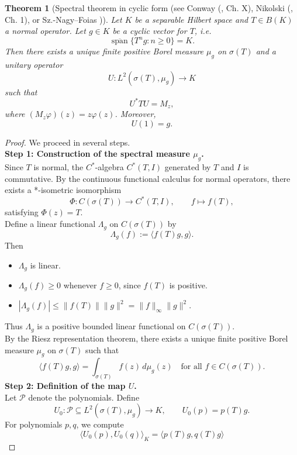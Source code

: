 \documentclass[a4paper,11pt]{article}
\theoremstyle{plain}
\newtheorem{theorem}{Theorem}[section]
\theoremstyle{definition}
\theoremstyle{remark}
\begin{document}
\begin{theorem}[Spectral theorem in cyclic form (see Conway (\cite{Conway1990}, Ch. X), Nikolski (\cite{Nikolski2002}, Ch. 1), or Sz.-Nagy–Foias \cite{NagyFoiasBercoviciKerchy2010})]
\label{theorem-spectral-decomposition-for-continuous-functional-calculus}
Let $K$ be a separable Hilbert space and $T \in B(K)$ a normal operator. 
Let $g \in K$ be a cyclic vector for $T$, i.e.
\[
\overline{\operatorname{span}}\{T^n g : n \ge 0\} = K.
\]
Then there exists a unique finite positive Borel measure $\mu_g$ on $\sigma(T)$ and a unitary operator
\[
U : L^2(\sigma(T), \mu_g) \to K
\]
such that
\[
U^* T U = M_z,
\]
where $(M_z \varphi)(z) = z \varphi(z)$.
Moreover,
\[
U(1) = g.
\]
\end{theorem}


\begin{proof}
We proceed in several steps. \\
\textbf{Step 1: Construction of the spectral measure $\mu_g$.} \\
Since $T$ is normal, the $C^*$-algebra $C^*(T,I)$ generated by $T$ and $I$ is commutative. 
By the continuous functional calculus for normal operators, there exists a *-isometric isomorphism
\[
\Phi : C(\sigma(T)) \longrightarrow C^*(T,I), 
\qquad f \mapsto f(T),
\]
satisfying $\Phi(z) = T$. \\
Define a linear functional $\Lambda_g$ on $C(\sigma(T))$ by
\[
\Lambda_g(f) := \langle f(T)g, g\rangle.
\]
Then \\
\begin{itemize}
\item $\Lambda_g$ is linear.
\item $\Lambda_g(f) \ge 0$ whenever $f \ge 0$, since $f(T)$ is positive.
\item $|\Lambda_g(f)| \le \|f(T)\|\|g\|^2 = \|f\|_\infty \|g\|^2$.
\end{itemize}
Thus $\Lambda_g$ is a positive bounded linear functional on $C(\sigma(T))$. \\
By the Riesz representation theorem, there exists a unique finite positive Borel measure $\mu_g$ on $\sigma(T)$ such that
\[
\langle f(T)g, g\rangle = \int_{\sigma(T)} f(z)\, d\mu_g(z)
\quad \text{for all } f \in C(\sigma(T)).
\]
\textbf{Step 2: Definition of the map $U$.} \\
Let $\mathcal{P}$ denote the polynomials. Define
\[
U_0 : \mathcal{P} \subseteq L^2(\sigma(T),\mu_g) \to K,
\qquad U_0(p) = p(T)g.
\]
For polynomials $p,q$, we compute
\[
\langle U_0(p), U_0(q)\rangle_K
= \langle p(T)g, q(T)g\rangle
\]
\end{proof}
\end{document}
